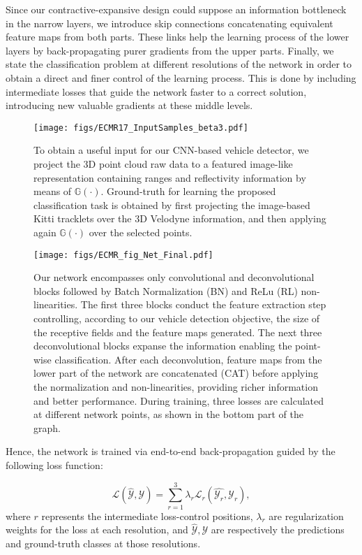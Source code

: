 \documentclass[letterpaper, 10 pt, conference]{ieeeconf}  %
\begin{document}
Since our contractive-expansive design could suppose an information bottleneck in the narrow layers, we introduce skip connections concatenating equivalent feature maps from both parts. These links help the learning process of the lower layers by back-propagating purer gradients from the upper parts.
Finally, we state the classification problem at different resolutions of the network in order to obtain a direct and finer control of the learning process. This is done by including intermediate losses that guide the network faster to a correct solution, introducing new valuable gradients at these middle levels.
\begin{figure}[t]
\centering
 \centerline{
  	\texttt{[image: figs/ECMR17\_InputSamples\_beta3.pdf]}}
  
  \caption{To obtain a useful input for our CNN-based vehicle detector, we project the 3D point cloud raw data to a featured image-like representation containing ranges and reflectivity information by means of $\mathbb{G}(\cdot)$. 
  Ground-truth for learning the proposed classification task is obtained by first projecting the image-based Kitti tracklets over the 3D Velodyne information, and then applying again $\mathbb{G}(\cdot)$ over the selected points.}
  
  \label{fig:imdb}
\end{figure}\begin{figure*}[t]
\centering
 \centerline{
  	\texttt{[image: figs/ECMR\_fig\_Net\_Final.pdf]}}
  
  \caption{Our network encompasses only convolutional and deconvolutional blocks followed by Batch Normalization (BN) and ReLu (RL) non-linearities. The first three blocks conduct the feature extraction step controlling, according to our vehicle detection objective, the size of the receptive fields and the feature maps generated. The next three deconvolutional blocks expanse the information enabling the point-wise classification. After each deconvolution, feature maps from the lower part of the network are concatenated (CAT) before applying the normalization and non-linearities, providing richer information and better performance. During training, three losses are calculated at different network points, as shown in the bottom part of the graph.}
  \label{fig:net}
\end{figure*}%
Hence, the network is trained via end-to-end back-propagation guided by the following loss function:

\begin{equation}%
\label{eq:CaF}
	\mathcal{L}(\hat{\mathcal{Y}}, \mathcal{Y}) =
	\sum_{r=1}^{3} \lambda_{r} \mathcal{L}_{r}(\hat{\mathcal{Y}_r}, {\mathcal{Y}_r}),
\end{equation}\noindent where $r$ represents the intermediate loss-control positions, $\lambda_{r}$ are regularization weights for the loss at each resolution, and $\hat{\mathcal{Y}}, \mathcal{Y}$ are respectively the predictions and ground-truth classes at those resolutions. 
\end{document}

